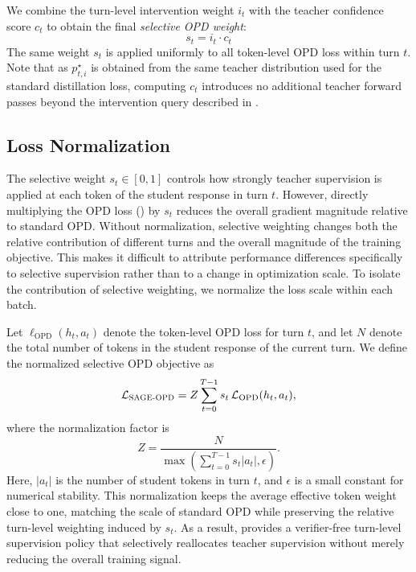 We combine the turn-level intervention weight $i_t$ with the teacher confidence score $c_t$ to obtain the final \textit{selective OPD weight}:
\begin{equation}
    s_t = i_t \cdot c_t
    \label{eq:selective_opd_weight}
\end{equation}
%
The same weight $s_t$ is applied uniformly to all token-level OPD loss within turn $t$. 
%
Note that as $p^{\star}_{t,i}$ is obtained from the same teacher distribution used for the standard distillation loss, computing $c_t$ introduces no additional teacher forward passes beyond the intervention query described in .
%


\subsection{Loss Normalization}
The selective weight $s_t \in [0,1]$ controls how strongly teacher supervision is applied at each token of the student response in turn $t$. 
%
However, directly multiplying the OPD loss () by $s_t$ reduces the overall gradient magnitude relative to standard OPD. 
%
Without normalization, selective weighting changes both the relative contribution of different turns and the overall magnitude of the training objective.
%
This makes it difficult to attribute performance differences specifically to selective supervision rather than to a change in optimization scale.
%
To isolate the contribution of selective weighting, we normalize the loss scale within each batch.
%

Let $\ell_{\mathrm{OPD}}(h_t,a_t)$ denote the token-level OPD loss for turn $t$, and let $N$ denote the total number of tokens in the student response of the current turn. 
%
We define the normalized selective OPD objective as
\begin{equation}
    \mathcal{L}_{\textsc{SAGE-OPD}}
    =
    Z
    \sum_{t=0}^{T-1}
    s_t \,
    \mathcal{L}_{\mathrm{OPD}}(h_t,a_t),
\end{equation}
where the normalization factor is
\begin{equation}
    Z
    =
    \frac{N}
    {
    \max\left(
    \sum_{t=0}^{T-1} s_t |a_t|,
    \epsilon
    \right)
    }.
\end{equation}
%
Here, $|a_t|$ is the number of student tokens in turn $t$, and $\epsilon$ is a small constant for numerical stability. 
%
This normalization keeps the average effective token weight close to one, matching the scale of standard OPD while preserving the relative turn-level weighting induced by $s_t$.
%
As a result, \ours provides a verifier-free turn-level supervision policy that selectively reallocates teacher supervision without merely reducing the overall training signal.
%
